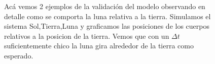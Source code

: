 \begin{figure}
	\centering
	\caption{
		Acá vemos 2 ejemplos de la validación del modelo observando en detalle como se comporta la luna relativa a la tierra.
		Simulamos el sistema Sol,Tierra,Luna y graficamos las posiciones de los cuerpos relativos a la posicion de la tierra.
		Vemos que con un $\Delta t$ suficientemente chico la luna gira alrededor de la tierra como esperado.
	}
	\label{ fig:res_ej1_err }
\end{figure}
